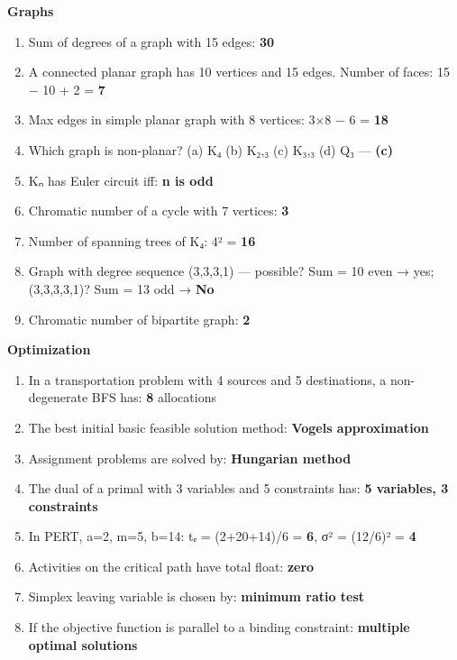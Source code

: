 \textbf{Graphs}

\begin{enumerate}
\def\labelenumi{\arabic{enumi}.}
\setcounter{enumi}{29}
\tightlist
\item
  Sum of degrees of a graph with 15 edges: \textbf{30}
\item
  A connected planar graph has 10 vertices and 15 edges. Number of faces: 15 − 10 + 2 = \textbf{7}
\item
  Max edges in simple planar graph with 8 vertices: 3×8 − 6 = \textbf{18}
\item
  Which graph is non-planar? (a) K₄ (b) K₂,₃ (c) K₃,₃ (d) Q₃ --- \textbf{(c)}
\item
  Kₙ has Euler circuit iff: \textbf{n is odd}
\item
  Chromatic number of a cycle with 7 vertices: \textbf{3}
\item
  Number of spanning trees of K₄: 4² = \textbf{16}
\item
  Graph with degree sequence (3,3,3,1) --- possible? Sum = 10 even → yes; (3,3,3,3,1)? Sum = 13 odd → \textbf{No}
\item
  Chromatic number of bipartite graph: \textbf{2}
\end{enumerate}

\textbf{Optimization}

\begin{enumerate}
\def\labelenumi{\arabic{enumi}.}
\setcounter{enumi}{38}
\tightlist
\item
  In a transportation problem with 4 sources and 5 destinations, a non-degenerate BFS has: \textbf{8} allocations
\item
  The best initial basic feasible solution method: \textbf{Vogel\textquotesingle s approximation}
\item
  Assignment problems are solved by: \textbf{Hungarian method}
\item
  The dual of a primal with 3 variables and 5 constraints has: \textbf{5 variables, 3 constraints}
\item
  In PERT, a=2, m=5, b=14: tₑ = (2+20+14)/6 = \textbf{6}, σ² = (12/6)² = \textbf{4}
\item
  Activities on the critical path have total float: \textbf{zero}
\item
  Simplex leaving variable is chosen by: \textbf{minimum ratio test}
\item
  If the objective function is parallel to a binding constraint: \textbf{multiple optimal solutions}
\end{enumerate}

